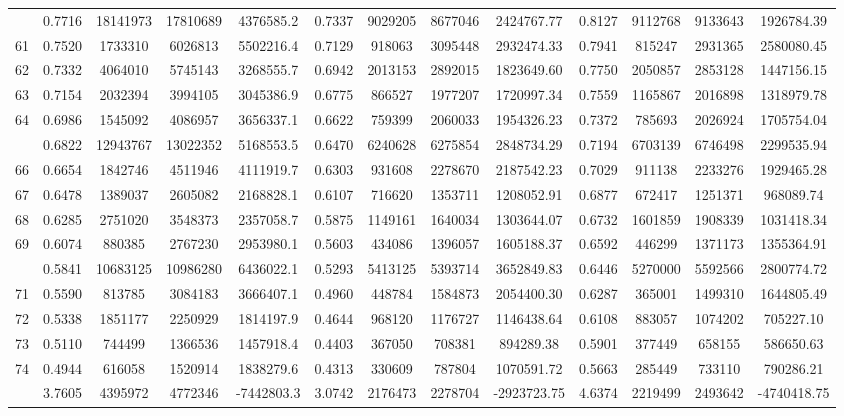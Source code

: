\documentclass[
  12pt,
]{article}
\begin{document}
\begin{longtable}[t]{lcccccccccccc}
\addlinespace
60 & 0.7716 & 18141973 & 17810689 & 4376585.2 & 0.7337 & 9029205 & 8677046 & 2424767.77 & 0.8127 & 9112768 & 9133643 & 1926784.39\\
61 & 0.7520 & 1733310 & 6026813 & 5502216.4 & 0.7129 & 918063 & 3095448 & 2932474.33 & 0.7941 & 815247 & 2931365 & 2580080.45\\
62 & 0.7332 & 4064010 & 5745143 & 3268555.7 & 0.6942 & 2013153 & 2892015 & 1823649.60 & 0.7750 & 2050857 & 2853128 & 1447156.15\\
63 & 0.7154 & 2032394 & 3994105 & 3045386.9 & 0.6775 & 866527 & 1977207 & 1720997.34 & 0.7559 & 1165867 & 2016898 & 1318979.78\\
64 & 0.6986 & 1545092 & 4086957 & 3656337.1 & 0.6622 & 759399 & 2060033 & 1954326.23 & 0.7372 & 785693 & 2026924 & 1705754.04\\
\addlinespace
65 & 0.6822 & 12943767 & 13022352 & 5168553.5 & 0.6470 & 6240628 & 6275854 & 2848734.29 & 0.7194 & 6703139 & 6746498 & 2299535.94\\
66 & 0.6654 & 1842746 & 4511946 & 4111919.7 & 0.6303 & 931608 & 2278670 & 2187542.23 & 0.7029 & 911138 & 2233276 & 1929465.28\\
67 & 0.6478 & 1389037 & 2605082 & 2168828.1 & 0.6107 & 716620 & 1353711 & 1208052.91 & 0.6877 & 672417 & 1251371 & 968089.74\\
68 & 0.6285 & 2751020 & 3548373 & 2357058.7 & 0.5875 & 1149161 & 1640034 & 1303644.07 & 0.6732 & 1601859 & 1908339 & 1031418.34\\
69 & 0.6074 & 880385 & 2767230 & 2953980.1 & 0.5603 & 434086 & 1396057 & 1605188.37 & 0.6592 & 446299 & 1371173 & 1355364.91\\
\addlinespace
70 & 0.5841 & 10683125 & 10986280 & 6436022.1 & 0.5293 & 5413125 & 5393714 & 3652849.83 & 0.6446 & 5270000 & 5592566 & 2800774.72\\
71 & 0.5590 & 813785 & 3084183 & 3666407.1 & 0.4960 & 448784 & 1584873 & 2054400.30 & 0.6287 & 365001 & 1499310 & 1644805.49\\
72 & 0.5338 & 1851177 & 2250929 & 1814197.9 & 0.4644 & 968120 & 1176727 & 1146438.64 & 0.6108 & 883057 & 1074202 & 705227.10\\
73 & 0.5110 & 744499 & 1366536 & 1457918.4 & 0.4403 & 367050 & 708381 & 894289.38 & 0.5901 & 377449 & 658155 & 586650.63\\
74 & 0.4944 & 616058 & 1520914 & 1838279.6 & 0.4313 & 330609 & 787804 & 1070591.72 & 0.5663 & 285449 & 733110 & 790286.21\\
\addlinespace
75 & 3.7605 & 4395972 & 4772346 & -7442803.3 & 3.0742 & 2176473 & 2278704 & -2923723.75 & 4.6374 & 2219499 & 2493642 & -4740418.75\\*
\end{longtable}
\endgroup{}
\end{document}
